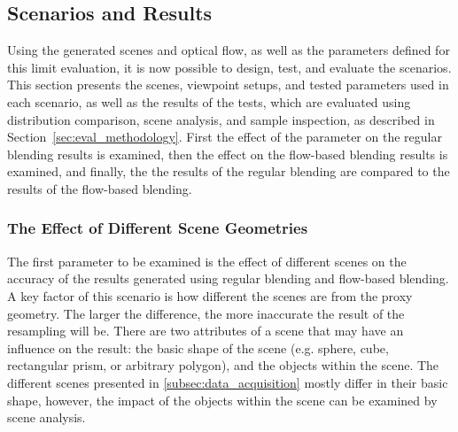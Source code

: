 
\subsection{Scenarios and Results}
Using the generated scenes and optical flow, as well as the parameters defined for this limit evaluation, it is now possible to design, test, and evaluate the scenarios. This section presents the scenes, viewpoint setups, and tested parameters used in each scenario, as well as the results of the tests, which are evaluated using distribution comparison, scene analysis, and sample inspection, as described in Section~\ref{sec:eval_methodology}. First the effect of the parameter on the regular blending results is examined, then the effect on the flow-based blending results is examined, and finally, the the results of the regular blending are compared to the results of the flow-based blending.

\subsubsection{The Effect of Different Scene Geometries}
The first parameter to be examined is the effect of different scenes on the accuracy of the results generated using regular blending and flow-based blending. A key factor of this scenario is how different the scenes are from the proxy geometry. The larger the difference, the more inaccurate the result of the resampling will be. There are two attributes of a scene that may have an influence on the result: the basic shape of the scene (e.g. sphere, cube, rectangular prism, or arbitrary polygon), and the objects within the scene. The different scenes presented in \ref{subsec:data_acquisition} mostly differ in their basic shape, however, the impact of the objects within the scene can be examined by scene analysis.

